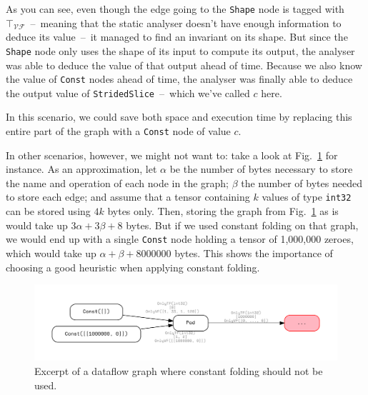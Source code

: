\documentclass[11pt]{article}
\begin{document}
As you can see, even though the edge going to the \texttt{Shape} node is tagged with $\top_\mathcal{VF}$~--~meaning that the static analyser doesn't have enough information to deduce its value~--~it managed to find an invariant on its shape. But since the \texttt{Shape} node only uses the shape of its input to compute its output, the analyser was able to deduce the value of that output ahead of time. Because we also know the value of \texttt{Const} nodes ahead of time, the analyser was finally able to deduce the output value of \texttt{StridedSlice}~--~which we've called $c$ here.

In this scenario, we could save both space and execution time by replacing this entire part of the graph with a \texttt{Const} node of value $c$.

In other scenarios, however, we might not want to: take a look at Fig.~\ref{fig-no-constant-propagation} for instance. As an approximation, let $\alpha$ be the number of bytes necessary to store the name and operation of each node in the graph; $\beta$ the number of bytes needed to store each edge; and assume that a tensor containing $k$ values of type \texttt{int32} can be stored using $4k$ bytes only. Then, storing the graph from Fig.~\ref{fig-no-constant-propagation} as is would take up $3\alpha + 3\beta + 8$ bytes. But if we used constant folding on that graph, we would end up with a single \texttt{Const} node holding a tensor of 1,000,000 zeroes, which would take up $\alpha + \beta + 8000000$ bytes. This shows the importance of choosing a good heuristic when applying constant folding.

\begin{figure}[!h]
\centering
    \caption{Excerpt of a dataflow graph where constant folding should not be used.}
    \label{fig-no-constant-propagation}
    \vspace{-1.8em}
    \hspace*{-3em}
    \includegraphics[width=1.1\textwidth]{no-constant-propagation.pdf}
    \vspace{-2em}
\end{figure}
\end{document}

